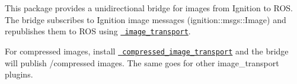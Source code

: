 This package provides a unidirectional bridge for images from Ignition to R\+OS. The bridge subscribes to Ignition image messages ({\ttfamily ignition\+::msgs\+::\+Image}) and republishes them to R\+OS using \href{http://wiki.ros.org/image_transport}{\texttt{ image\+\_\+transport}}.

For compressed images, install \href{http://wiki.ros.org/compressed_image_transport}{\texttt{ compressed\+\_\+image\+\_\+transport}} and the bridge will publish {\ttfamily /compressed} images. The same goes for other {\ttfamily image\+\_\+transport} plugins. 